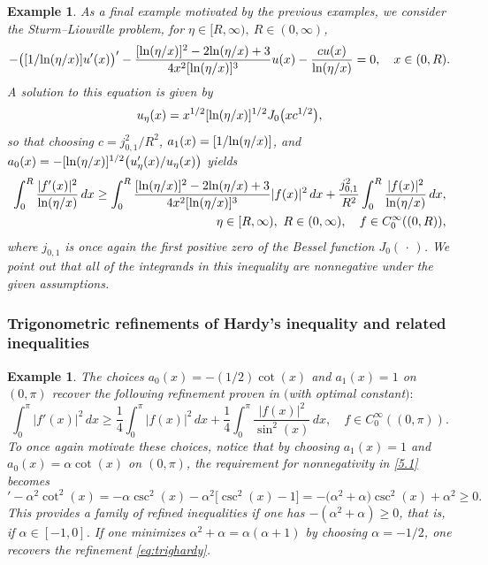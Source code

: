\documentclass[reqno,10pt,centertags]{amsart}
\renewcommand{\a}{\alpha}
\renewcommand{\ln}{\text{\rm ln}}
\newcommand{\dott}{\,\cdot\,}
\numberwithin{equation}{section}
\newtheorem{example}[theorem]{Example}
\theoremstyle{remark}
\begin{document}
\begin{example}
As a final example motivated by the previous examples, we consider the Sturm--Liouville problem, for $\eta\in[R,\infty),\ R\in(0,\infty)$,
\begin{align}
-\big([1/\ln(\eta/x)]u'(x)\big)'-\frac{ [\ln(\eta/x)]^{2} - 2\ln(\eta/x)+3}{4 x^2[ \ln(\eta/x)]^{3}} u(x)-\frac{c u(x)}{\ln(\eta/x)}=0,\quad x\in(0,R).
\end{align}
A solution to this equation is given by
\begin{equation}
u_\eta(x)=x^{1/2}[\ln(\eta/x)]^{1/2}J_0\big(x c^{1/2}\big),
\end{equation}
so that choosing $c= j_{0,1}^2/R^2$, $a_1(x)=[1/\ln(\eta/x)]$, and $a_0(x)=-[\ln(\eta/x)]^{1/2}\big(u'_\eta(x)/u_\eta(x)\big)$ yields
\begin{align}
\begin{split}
\int_0^R \frac{|f'(x)|^2}{\ln(\eta/x)}\, dx\geq  \int_0^R \frac{ [\ln(\eta/x)]^{2} - 2\ln(\eta/x)+3}{4 x^2[ \ln(\eta/x)]^{3}} |f(x)|^2\, dx +\frac{j_{0,1}^2}{R^2}\int_0^R \frac{|f(x)|^2}{\ln(\eta/x)}\, dx,\\
\eta\in[R,\infty),\  R\in(0,\infty),\quad f\in C_0^\infty ((0,R)),
\end{split}
\end{align}
where $j_{0,1}$ is once again the first positive zero of the Bessel function $J_0(\dott)$. We point out that all of the integrands in this inequality are nonnegative under the given assumptions.
\end{example}

\subsubsection{Trigonometric refinements of Hardy's inequality and related inequalities}
\begin{example}
The choices $a_0(x)=-(1/2)\cot(x)$ and $a_1(x)=1$ on $(0,\pi)$ recover the following refinement proven in \cite{GPS21} $($with optimal constant$)$$:$
\begin{equation}\label{eq:trighardy}
\int_0^\pi |f'(x)|^2\, dx \geq \frac{1}{4}\int_0^\pi |f(x)|^2\, dx + \frac{1}{4}\int_0^\pi \frac{|f(x)|^2}{\sin^2(x)}\, dx,\quad f\in C^\infty_0((0,\pi)) .
\end{equation}
To once again motivate these choices, notice that by choosing $a_1(x)=1$ and $a_0(x)=\a\cot(x)$ on $(0,\pi)$, the requirement for nonnegativity in \eqref{5.1} becomes
\begin{equation}
[\a\cot(x)]'-\a^2\cot^2(x)=-\a\csc^2(x)-\a^2\big[\csc^2(x)-1\big]=-\big(\a^2+\a\big)\csc^2(x)+\a^2\geq0.
\end{equation}
This provides a family of refined inequalities if one has $-(\a^2+\a)\geq0$, that is, if $\a\in[-1,0]$. If one minimizes $\a^2+\a=\a(\a+1)$ by choosing $\a=-1/2$, one recovers the refinement \eqref{eq:trighardy}.
\end{example}
\end{document}
